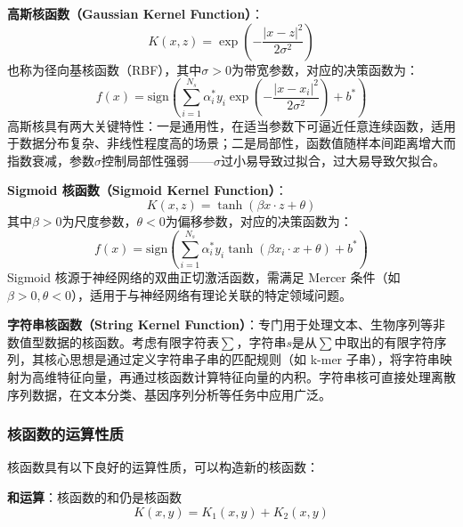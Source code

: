 \documentclass{article}
\newenvironment{solution_cn}{%
  \begin{proof}[解答]%
}{%
  \end{proof}%
}
\begin{document}
\begin{solution_cn}
\textbf{高斯核函数（Gaussian Kernel Function）}：
\begin{equation}
K(x, z) = \exp\left(-\frac{|x - z|^2}{2\sigma^2}\right)
\end{equation}
\hspace{2em}也称为径向基核函数（RBF），其中$\sigma > 0$为带宽参数，对应的决策函数为：
\begin{equation}
f(x) = \text{sign}\left(\sum_{i=1}^{N_s} \alpha_i^* y_i \exp\left(-\frac{|x - x_i|^2}{2\sigma^2}\right) + b^*\right)
\end{equation}
\hspace{2em}高斯核具有两大关键特性：一是通用性，在适当参数下可逼近任意连续函数，适用于数据分布复杂、非线性程度高的场景；二是局部性，函数值随样本间距离增大而指数衰减，参数$\sigma$控制局部性强弱——$\sigma$过小易导致过拟合，过大易导致欠拟合。


\textbf{Sigmoid 核函数（Sigmoid Kernel Function）}：
\begin{equation}
K(x, z) = \tanh(\beta x \cdot z + \theta)
\end{equation}
\hspace{2em}其中$\beta > 0$为尺度参数，$\theta < 0$为偏移参数，对应的决策函数为：
\begin{equation}
f(x) = \text{sign}\left(\sum_{i=1}^{N_s} \alpha_i^* y_i \tanh(\beta x_i \cdot x + \theta) + b^*\right)
\end{equation}
\hspace{2em}Sigmoid 核源于神经网络的双曲正切激活函数，需满足 Mercer 条件（如$\beta > 0, \theta < 0$），适用于与神经网络有理论关联的特定领域问题。


\textbf{字符串核函数（String Kernel Function）}：专门用于处理文本、生物序列等非数值型数据的核函数。考虑有限字符表$\sum$，字符串$s$是从$\sum$中取出的有限字符序列，其核心思想是通过定义字符串子串的匹配规则（如 k-mer 子串），将字符串映射为高维特征向量，再通过核函数计算特征向量的内积。字符串核可直接处理离散序列数据，在文本分类、基因序列分析等任务中应用广泛。

\subsubsection{核函数的运算性质}

核函数具有以下良好的运算性质，可以构造新的核函数：

\textbf{和运算}：核函数的和仍是核函数
\begin{equation}
K(x, y) = K_1(x, y) + K_2(x, y)
\end{equation}


\end{solution_cn}
\end{document}
